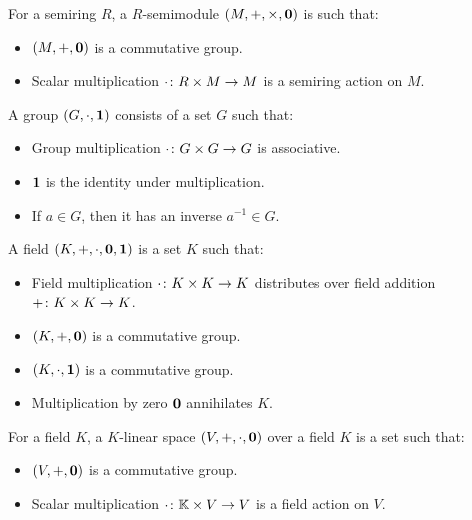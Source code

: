\documentclass[12pt]{article}
\begin{document}
\begin{definition}[Semimodule]
  For a semiring \(R\), a \(R\)-semimodule
  \(\left(M, +, \times, \mathbf{0}\right)\)
  is such that:
  \begin{itemize}
    \item
      \(\left(M, +, \mathbf{0}\right)\) is a commutative group.

    \item
      Scalar multiplication
      \(\cdot \colon R \times M \to M\) is a semiring action on \(M\).

  \end{itemize}
\end{definition}

\begin{definition}[Group]
  A group \(\left(G, \cdot, \mathbf{1}\right)\) consists of a set \(G\) such that:
  \begin{itemize}
    \item
      Group multiplication \(\cdot \colon G \times G \to G\) is associative.

    \item
      \(\mathbf{1}\) is the identity under multiplication.

    \item
      If \(a \in G\), then it has an inverse \(a^{-1} \in G\).
  \end{itemize}
\end{definition}

\begin{definition}[Field]
  A field \(\left(K, +, \cdot, \mathbf{0}, \mathbf{1}\right)\) is a set \(K\) such that:
  \begin{itemize}
    \item
      Field multiplication \(\cdot \colon K \times K \to K\)
      distributes over field addition \(+ \colon K \times K \to K\).

    \item
      \(\left(K, +, \mathbf{0}\right)\) is a commutative group.

    \item
      \(\left(K, \cdot, \mathbf{1}\right)\) is a commutative group.

    \item
      Multiplication by zero \(\mathbf{0}\) annihilates \(K\).
  \end{itemize}
\end{definition}

\begin{definition}
  For a field \(K\),
  a \(K\)-linear space \(\left(V, +, \cdot, \mathbf{0}\right)\) over a field \(K\)
  is a set such that:
  \begin{itemize}
    \item
      \(\left(V, +, \mathbf{0}\right)\) is a commutative group.

    \item
      Scalar multiplication
      \(\cdot \colon \mathbb{K} \times V \to V\) is a field action on \(V\).

  \end{itemize}
\end{definition}
\end{document}
